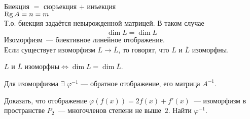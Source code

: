 Биекция $=$ сюръекция $+$ инъекция\\
$\operatorname{\mathop{Rg}} A=n=m$\\
Т.о. биекция задаётся невырожденной матрицей. В таком случае
$$\dim L = \dim \overline L$$
Изоморфизм~--- биективное линейное отображение.\\
Если существует изоморфизм $L \to \overline L$, то говорят, что $L$ и $\overline L$ изоморфны.

\begin{theorem}
$L$ и $\overline L$ изоморфны$\iff \dim L =
\dim \overline L$.
\end{theorem}

Для изоморфизма $\exists$ $\varphi^{-1}$ --- \textsf{обратное отображение}, его матрица $A^{-1}$.

\begin{prim}
Доказать, что отображение $\varphi(f(x)) = 2f(x) + f'(x)$~--- изоморфизм
в пространстве $P_2$~---  многочленов степени не выше~$2$. Найти $\varphi^{-1}$.\\


\end{prim}
